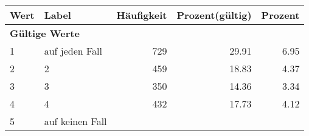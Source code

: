      \begin{longtable}{lXrrr}
     \toprule
     \textbf{Wert} & \textbf{Label} & \textbf{Häufigkeit} & \textbf{Prozent(gültig)} & \textbf{Prozent} \\
     \endhead
     \midrule
     \multicolumn{5}{l}{\textbf{Gültige Werte}}\\

     1 &
     \multicolumn{1}{X}{ auf jeden Fall   } &


       \num{729} &
       \num[round-mode=places,round-precision=2]{29,91} &
         \num[round-mode=places,round-precision=2]{6,95} \\

     2 &
     \multicolumn{1}{X}{ 2   } &


       \num{459} &
       \num[round-mode=places,round-precision=2]{18,83} &
         \num[round-mode=places,round-precision=2]{4,37} \\

     3 &
     \multicolumn{1}{X}{ 3   } &


       \num{350} &
       \num[round-mode=places,round-precision=2]{14,36} &
         \num[round-mode=places,round-precision=2]{3,34} \\

     4 &
     \multicolumn{1}{X}{ 4   } &


       \num{432} &
       \num[round-mode=places,round-precision=2]{17,73} &
         \num[round-mode=places,round-precision=2]{4,12} \\

     5 &
     \multicolumn{1}{X}{ auf keinen Fall   } &



\end{longtable}
